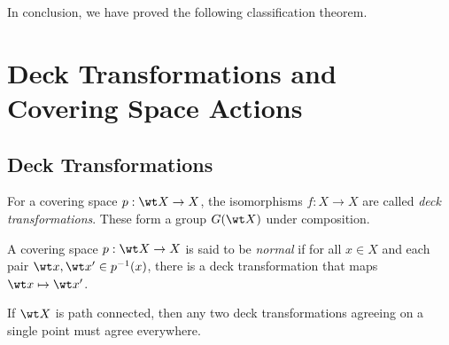 In conclusion, we have proved the following classification theorem.

\begin{theorem}
    
\end{theorem}

\section{Deck Transformations and Covering Space Actions}

\subsection{Deck Transformations}
\begin{definition}
    For a covering space $p:\wt X\to X$, the isomorphisms $f: X\to X$ are called \textit{deck transformations}. These form a group $G(\wt X)$ under composition. 

    A covering space $p:\wt X\to X$ is said to be \textit{normal} if for all $x\in X$ and each pair $\wt x,\wt x'\in p^{-1}(x)$, there is a deck transformation that maps $\wt x\mapsto\wt x'$.
\end{definition}

\begin{remark}
    If $\wt X$ is path connected, then any two deck transformations agreeing on a single point must agree everywhere.
\end{remark}

